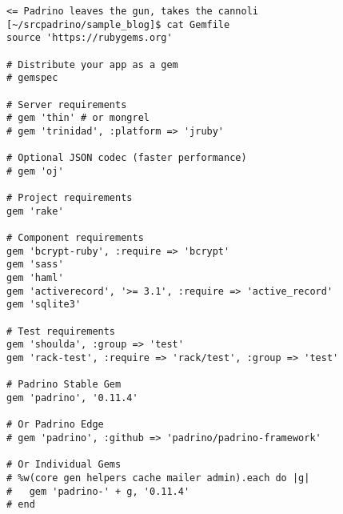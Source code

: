\begin{verbatim}
<= Padrino leaves the gun, takes the cannoli
[~/srcpadrino/sample_blog]$ cat Gemfile
source 'https://rubygems.org'

# Distribute your app as a gem
# gemspec

# Server requirements
# gem 'thin' # or mongrel
# gem 'trinidad', :platform => 'jruby'

# Optional JSON codec (faster performance)
# gem 'oj'

# Project requirements
gem 'rake'

# Component requirements
gem 'bcrypt-ruby', :require => 'bcrypt'
gem 'sass'
gem 'haml'
gem 'activerecord', '>= 3.1', :require => 'active_record'
gem 'sqlite3'

# Test requirements
gem 'shoulda', :group => 'test'
gem 'rack-test', :require => 'rack/test', :group => 'test'

# Padrino Stable Gem
gem 'padrino', '0.11.4'

# Or Padrino Edge
# gem 'padrino', :github => 'padrino/padrino-framework'

# Or Individual Gems
# %w(core gen helpers cache mailer admin).each do |g|
#   gem 'padrino-' + g, '0.11.4'
# end
\end{verbatim}


